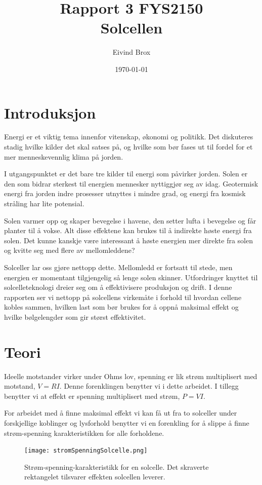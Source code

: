 \documentclass[a4paper,11pt, twocolumn]{article}
\title{Rapport 3 FYS2150\\Solcellen}
\author{Eivind Brox}
\date{\today}
\begin{document}
\maketitle
\listoftodos
\begin{abstract}

\end{abstract}

\section{Introduksjon}
Energi er et viktig tema innenfor vitenskap, økonomi og politikk. Det diskuteres stadig hvilke kilder det skal satses på, og hvilke som bør fases ut til fordel for et mer menneskevennlig klima på jorden. 

I utgangspunktet er det bare tre kilder til energi som påvirker jorden. Solen er den som bidrar sterkest til energien mennesker nyttiggjør seg av idag. Geotermisk energi fra jorden indre prosesser utnyttes i mindre grad, og energi fra kosmisk stråling har lite potensial.

Solen varmer opp og skaper bevegelse i havene, den setter lufta i bevegelse og får planter til å vokse. Alt disse effektene kan brukes til å indirekte høste energi fra solen. Det kunne kanskje være interessant å høste energien mer direkte fra solen og kvitte seg med flere av mellomleddene?

Solceller lar oss gjøre nettopp dette. Mellomledd er fortsatt til stede, men energien er momentant tilgjengelig så lenge solen skinner. Utfordringer knyttet til solcelleteknologi dreier seg om å effektivisere produksjon og drift. I denne rapporten ser vi nettopp på solcellens virkemåte i forhold til hvordan cellene kobles sammen, hvilken last som bør brukes for å oppnå maksimal effekt og hvilke bølgelengder som gir størst effektivitet.   
\section{Teori}
Ideelle motstander virker under Ohms lov, spenning er lik strøm multiplisert med motstand, $V=RI$. Denne forenklingen benytter vi i dette arbeidet. I tillegg benytter vi at effekt er spenning multiplisert med strøm, $P = VI$.

For arbeidet med å finne maksimal effekt vi kan få ut fra to solceller under forskjellige koblinger og lysforhold benytter vi en forenkling for å slippe å finne strøm-spenning karakteristikken for alle forholdene.

\begin{figure}[!ht]
	\texttt{[image: stromSpenningSolcelle.png]}
	\caption{Strøm-spenning-karakteristikk for en solcelle. Det skraverte rektangelet tilsvarer effekten solcellen leverer.}
	\label{fig:powerCurrentVoltage}
\end{figure}
\end{document}
